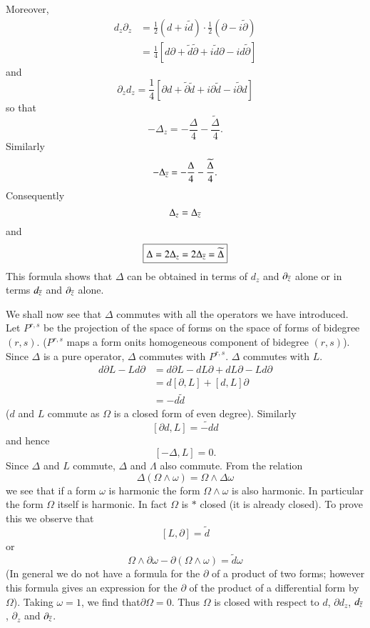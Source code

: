Moreover,
\begin{align*}
d_{z}\partial_{z} &= \frac{1}{2}(d+i\widetilde{d})\cdot
\frac{1}{2}(\partial -i\widetilde{\partial})\\
&= \frac{1}{4}[d\partial
  +\widetilde{d}\widetilde{\partial}+i\widetilde{d}\partial
  -id\widetilde{\partial}]
\end{align*}
and 
$$
\partial_{z}d_{z}=\frac{1}{4}[\partial
  d+\widetilde{\partial}\widetilde{d}+i\partial
  \widetilde{d}-i\widetilde{\partial}d] 
$$
so that
$$
-\Delta_{z}=-\frac{\Delta}{4}-\frac{\widetilde{\Delta}}{4}.
$$
Similarly
$$
-\Delta_{\overline{z}}=-\frac{\Delta}{4}-\frac{\widetilde{\Delta}}{4}.
$$
Consequently
$$
\Delta_{z}=\Delta_{\overline{z}}
$$
and
$$
\boxed{\Delta=2\Delta_{z}=2\Delta_{\overline{z}}=\widetilde{\Delta}}
$$
This formula shows that $\Delta$ can be obtained in terms of $d_{z}$
and $\partial_{\overline{z}}$ alone or in terms $d_{\overline{z}}$ and
$\partial_{\overline{z}}$ alone.

We shall now see that $\Delta$ commutes with all the operators we have
introduced. Let $P^{r,s}$ be the projection of the space of forms on
the space of forms of bidegree $(r,s)$. ($P^{r,s}$ maps a form
on\pageoriginale its homogeneous component of bidegree $(r,s)$). Since
$\Delta$ is a pure operator, $\Delta$ commutes with
$P^{r,s}$. $\Delta$ commutes with $L$.
\begin{align*}
d\partial L-Ld\partial &= d\partial
L-dL\partial+dL\partial-Ld\partial\\
&= d[\partial, L]+[d,L]\partial\\
&=-d\widetilde{d}
\end{align*}
($d$ and $L$ commute as $\Omega$ is a closed form of even
degree). Similarly
$$
[\partial d,L]=\widetilde{-d}d
$$
and hence
$$
[-\Delta,L]=0.
$$
Since $\Delta$ and $L$ commute, $\Delta$ and $\Lambda$ also
commute. From the relation
$$
\Delta(\Omega\wedge\omega)=\Omega\wedge\Delta\omega
$$
we see that if a form $\omega$ is harmonic the form $\Omega\wedge
\omega$ is also harmonic. In particular the form $\Omega$ itself is
harmonic. In fact $\Omega$ is $\ast$ closed (it is already closed). To
prove this we observe that
$$
[L,\partial]=\widetilde{d}
$$
or
$$
\Omega\wedge\partial\omega-\partial(\Omega\wedge\omega)=\widetilde{d}\omega
$$
(In general we do not have a formula for the $\partial$ of a product
of two forms; however this formula gives an expression for the
$\partial$ of the product of a differential form by $\Omega$). Taking
$\omega=1$, we find that\pageoriginale $\partial\Omega=0$. Thus
$\Omega$ is closed with respect to $d$, $\partial d_{z}$,
$d_{\overline{z}}$, $\partial_{z}$ and $\partial_{\overline{z}}$.  


